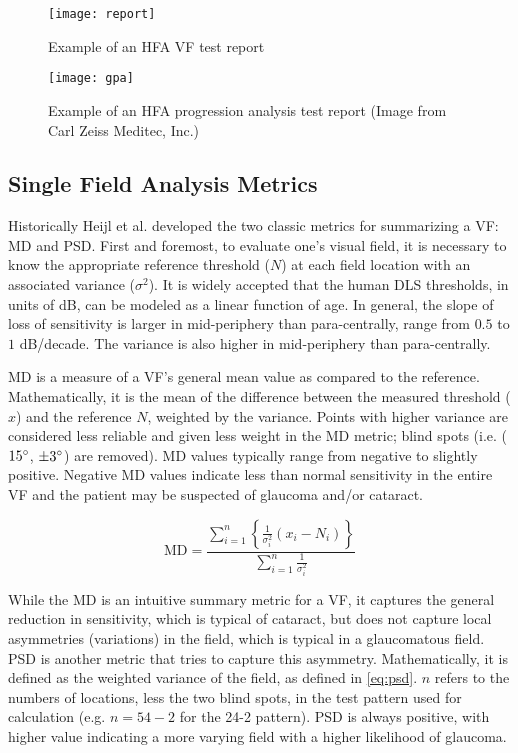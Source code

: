 \begin{figure}[p]
	\texttt{[image: report]}
	\caption{Example of an \ac{HFA} \ac{VF} test report}
	\label{fig:report}
\end{figure}

\begin{figure}[p]
	\texttt{[image: gpa]}
	\caption{Example of an \ac{HFA} progression analysis test report (Image from Carl Zeiss Meditec, Inc.)}
	\label{fig:gpa}
\end{figure}

\subsection{Single Field Analysis Metrics}

Historically Heijl et al. developed the two classic metrics for summarizing a \ac{VF}: \ac{MD} and \ac{PSD}. \cite{Heijl1987} First and foremost, to evaluate one's visual field, it is necessary to know the appropriate reference threshold ($N$) at each field location with an associated variance ($\sigma^2$). It is widely accepted that the human \ac{DLS} thresholds, in units of dB, can be modeled as a linear function of age. \cite{Heijl1987a} In general, the slope of loss of sensitivity is larger in mid-periphery than para-centrally, range from $0.5$ to $1$ dB/decade. The variance is also higher in mid-periphery than para-centrally. 

\ac{MD} is a measure of a \ac{VF}'s general mean value as compared to the reference. Mathematically, it is the mean of the difference between the measured threshold ($x$) and the reference $N$, weighted by the variance. Points with higher variance are considered less reliable and given less weight in the \ac{MD} metric; blind spots (i.e. ($15\degree$, $\pm3\degree$) are removed). MD values typically range from negative to slightly positive. Negative MD values indicate less than normal sensitivity in the entire \ac{VF} and the patient may be suspected of glaucoma and/or cataract.

\begin{equation} \label{eq:md}
\textrm{MD} =\frac{ 
\sum\limits_{i=1}^{n} \left\{
\frac{1}{\sigma_{i}^2} (x_i-N_i)
\right\} }{
\sum\limits_{i=1}^{n} 
\frac{1}{\sigma_{i}^2} 
}
\end{equation}

While the \ac{MD} is an intuitive summary metric for a \ac{VF}, it captures the general reduction in sensitivity, which is typical of cataract, but does not capture local asymmetries (variations) in the field, which is typical in a glaucomatous field. \ac{PSD} is another metric that tries to capture this asymmetry. Mathematically, it is defined as the weighted variance of the field, as defined in \cref{eq:psd}. $n$ refers to the numbers of locations, less the two blind spots, in the test pattern used for calculation (e.g. $n=54-2$ for the 24-2 pattern). \ac{PSD} is always positive, with higher value indicating a more varying field with a higher likelihood of glaucoma.

